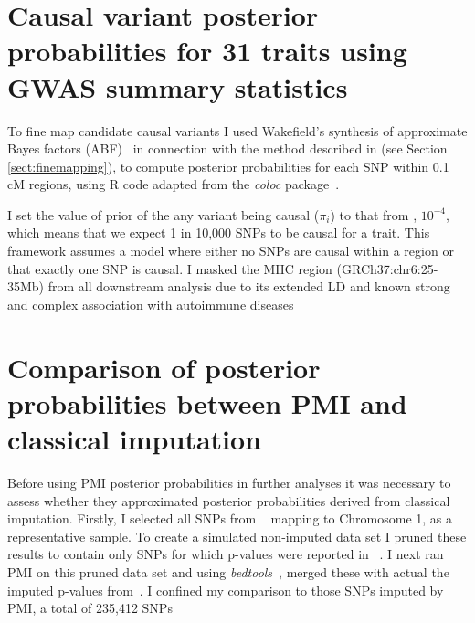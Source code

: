 \documentclass[a4paper,11pt]{report}
\begin{document}
\section{Causal variant posterior probabilities for 31 traits using GWAS summary statistics}
To fine map candidate causal variants I used Wakefield's synthesis of approximate Bayes factors (ABF)~\citep{Wakefield2009} in connection with the method described in \citet{The_Wellcome_Trust_Case_Control_Consortium2012-ad} (see Section \ref{sect:finemapping}), to compute posterior probabilities for each SNP within 0.1 cM regions, using R code adapted from the \textit{coloc} package~\citep{GiambartolomeiVukcevicSchadtEtAl2014}.  

I set the value of prior of the any variant being causal ($\pi_{i}$) to that from \citet{GiambartolomeiVukcevicSchadtEtAl2014}, $10^{-4}$, which means that we expect 1 in 10,000 SNPs to be causal for a trait. This framework assumes a model where either no SNPs are causal within a region or that exactly one SNP is causal. I masked the MHC region (GRCh37:chr6:25-35Mb) from all downstream analysis due to its extended LD and known strong and complex association with autoimmune diseases

\section{Comparison of posterior probabilities between PMI and classical imputation}
Before using PMI posterior probabilities in further analyses it was necessary to assess whether they approximated posterior probabilities derived from classical imputation. Firstly, I selected all SNPs from ~\citet{Okada2014-um} mapping to Chromosome 1, as a representative sample. To create a simulated non-imputed data set I pruned these results to contain only SNPs for which p-values were reported in ~\citet{Stahl2010-wz}. I next ran PMI on this pruned data set and using \textit{bedtools}~\citep{Quinlan2014}, merged these with actual the imputed p-values from~\citet{Okada2014-um}. I confined my comparison to those SNPs imputed by PMI, a total of 235,412 SNPs

\

\end{document}
